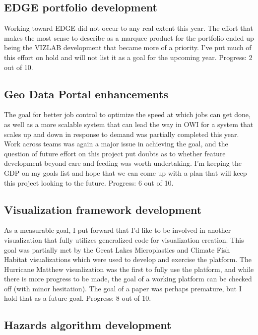 \documentclass{article}
\begin{document}
\subsection{EDGE portfolio development}

Working toward EDGE did not occur to any real extent this year.
The effort that makes the most sense to describe as a marquee product for the portfolio ended up being the VIZLAB development that became more of a priority.
I've put much of this effort on hold and will not list it as a goal for the upcoming year.
Progress: 2 out of 10.

\subsection{Geo Data Portal enhancements}

The goal for better job control to optimize the speed at which jobs can get done, as well as a more scalable system that can lead the way in OWI for a system that scales up and down in response to demand was partially completed this year.
Work across teams was again a major issue in achieving the goal, and the question of future effort on this project put doubts as to whether feature development beyond care and feeding was worth undertaking.
I'm keeping the GDP on my goals list and hope that we can come up with a plan that will keep this project looking to the future.
Progress: 6 out of 10.


\subsection{Visualization framework development}

As a measurable goal, I put forward that I'd like to be involved in another visualization that fully utilizes generalized code for visualization creation.
This goal was partially met by the Great Lakes Microplastics and Climate Fish Habitat visualizations which were used to develop and exercise the platform.
The Hurricane Matthew visualization was the first to fully use the platform, and while there is more progress to be made, the goal of a working platform can be checked off (with minor hesitation).
The goal of a paper was perhaps premature, but I hold that as a future goal.
Progress: 8 out of 10.

\subsection{Hazards algorithm development}
\end{document}
